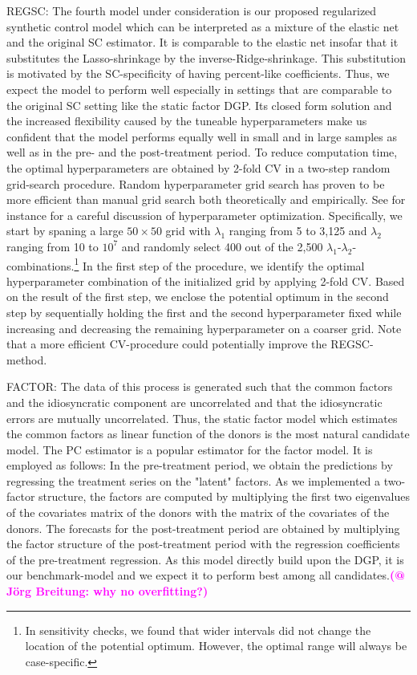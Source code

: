 REGSC: The fourth model under consideration is our proposed regularized synthetic control model which can be interpreted as a mixture of the elastic net and the original \ac{SC} estimator. It is comparable to the elastic net insofar that it substitutes the Lasso-shrinkage by the inverse-Ridge-shrinkage. This substitution is motivated by the \ac{SC}-specificity of having percent-like coefficients. Thus, we expect the model to perform well especially in settings that are comparable to the original \ac{SC} setting like the static factor \ac{DGP}. Its closed form solution and the increased flexibility caused by the tuneable hyperparameters make us confident that the model performs equally well in small and in large samples as well as in the pre- and the post-treatment period. To reduce computation time, the optimal hyperparameters are obtained by 2-fold \ac{CV} in a two-step random grid-search procedure. Random hyperparameter grid search has proven to be more efficient than manual grid search both theoretically and empirically. See for instance \cite{bergstra:2012} for a careful discussion of hyperparameter optimization. Specifically, we start by spaning a large $50 \times 50$ grid with $\lambda_1$ ranging from 5 to 3,125 and $\lambda_2$ ranging from 10 to $10^7$ and randomly select 400 out of the 2,500 $\lambda_1$-$\lambda_2$-combinations.\footnote{In sensitivity checks, we found that wider intervals did not change the location of the potential optimum. However, the optimal range will always be case-specific.} In the first step of the procedure, we identify the optimal hyperparameter combination of the initialized grid by applying 2-fold \ac{CV}. Based on the result of the first step, we enclose the potential optimum in the second step by sequentially holding the first and the second hyperparameter fixed while increasing and decreasing the remaining hyperparameter on a coarser grid. Note that a more efficient \ac{CV}-procedure could potentially improve the \ac{REGSC}-method.

FACTOR: The data of this process is generated such that the common factors and the idiosyncratic component are uncorrelated and that the idiosyncratic errors are mutually uncorrelated. Thus, the static factor model which estimates the common factors as linear function of the donors is the most natural candidate model. The \ac{PC} estimator is a popular estimator for the factor model. It is employed as follows: In the pre-treatment period, we obtain the predictions by regressing the treatment series on the "latent" factors. As we implemented a two-factor structure, the factors are computed by multiplying the first two eigenvalues of the covariates matrix of the donors with the matrix of the covariates of the donors. The forecasts for the post-treatment period are obtained by multiplying the factor structure of the post-treatment period with the regression coefficients of the pre-treatment regression. As this model directly build upon the \ac{DGP}, it is our benchmark-model and we expect it to perform best among all candidates.\textcolor{magenta}{\textbf{(@ Jörg Breitung: why no overfitting?)}} 

